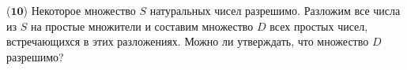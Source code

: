 ($\mathbf{10}$)
Некоторое множество $S$ натуральных чисел разрешимо. Разложим все числа из $S$ на простые множители и составим множество $D$
всех простых чисел, встречающихся в этих разложениях. Можно ли утверждать, что множество $D$ разрешимо?